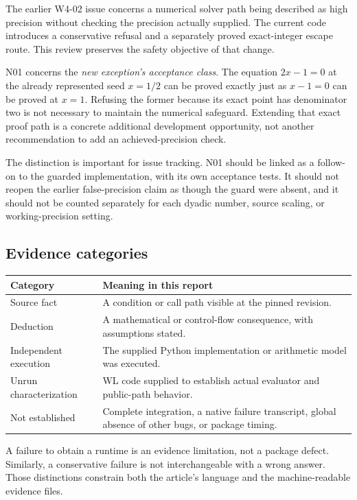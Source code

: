 \documentclass[11pt,letterpaper]{article}
\begin{document}
The earlier W4-02 issue concerns a numerical solver path being described as high precision without checking the precision actually supplied. The current code introduces a conservative refusal and a separately proved exact-integer escape route. This review preserves the safety objective of that change.\cite{wave4,review28,mathics-numeric}

N01 concerns the \emph{new exception's acceptance class}. The equation $2x-1=0$ at the already represented seed $x=1/2$ can be proved exactly just as $x-1=0$ can be proved at $x=1$. Refusing the former because its exact point has denominator two is not necessary to maintain the numerical safeguard. Extending that exact proof path is a concrete additional development opportunity, not another recommendation to add an achieved-precision check.

The distinction is important for issue tracking. N01 should be linked as a follow-on to the guarded implementation, with its own acceptance tests. It should not reopen the earlier false-precision claim as though the guard were absent, and it should not be counted separately for each dyadic number, source scaling, or working-precision setting.

\subsection{Evidence categories}

\begin{tabularx}{\textwidth}{@{}P{1.35in}Y@{}}
\toprule
Category & Meaning in this report\\\midrule
Source fact & A condition or call path visible at the pinned revision.\\[4pt]
Deduction & A mathematical or control-flow consequence, with assumptions stated.\\[4pt]
Independent execution & The supplied Python implementation or arithmetic model was executed.\\[4pt]
Unrun characterization & WL code supplied to establish actual evaluator and public-path behavior.\\[4pt]
Not established & Complete integration, a native failure transcript, global absence of other bugs, or package timing.\\
\bottomrule
\end{tabularx}

A failure to obtain a runtime is an evidence limitation, not a package defect. Similarly, a conservative failure is not interchangeable with a wrong answer. Those distinctions constrain both the article's language and the machine-readable evidence files.
\end{document}

